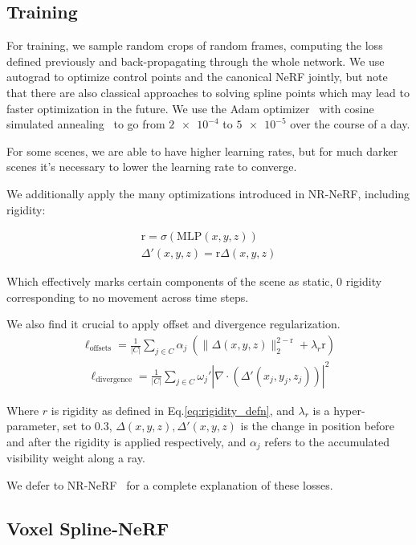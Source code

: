 \subsection*{Training}

For training, we sample random crops of random frames, computing the loss defined previously and back-propagating through the whole network. We use autograd to optimize control points and the canonical NeRF jointly, but note that there are also classical approaches to solving spline points which may lead to faster optimization in the future. We use the Adam optimizer~\cite{Kingma2015AdamAM} with cosine simulated annealing~\cite{loshchilov2017sgdr} to go from $\num{2e-4}$ to $\num{5e-5}$ over the course of a day.

For some scenes, we are able to have higher learning rates, but for much darker scenes it's necessary to lower the learning rate to converge.

We additionally apply the many optimizations introduced in NR-NeRF, including rigidity:

\begin{align}\label{eq:rigidity_defn}
    \text{r} = \sigma(\text{MLP}(x,y,z)) \\
    \Delta'(x,y,z) = \text{r}\Delta(x,y,z)
\end{align}

Which effectively marks certain components of the scene as static, 0 rigidity corresponding to no movement across time steps.

We also find it crucial to apply offset and divergence regularization.
\begin{align}
\ell_{\text{offsets}} = \frac{1}{|C|} \sum_{j\in C} \alpha_j \
    (\lVert \Delta(x,y,z) \rVert_2^{2-\text{r}}+\lambda_r \text{r})
\end{align}
\begin{align}
    \ell_{\text{divergence}} = \frac{1}{|C|} \sum_{j\in C} \omega_j' |\nabla\cdot(\Delta'(x_j,y_j,z_j))|^2
\end{align}

Where $r$ is rigidity as defined in Eq.\ref{eq:rigidity_defn}, and $\lambda_r$ is a hyper-parameter, set to 0.3, $\Delta(x,y,z), \Delta'(x,y,z)$ is the change in position before and after the rigidity is applied respectively, and $\alpha_j$ refers to the accumulated visibility weight along a ray.

We defer to NR-NeRF~\cite{tretschk2021nonrigid} for a complete explanation of these losses.

\subsection{Voxel Spline-NeRF}

